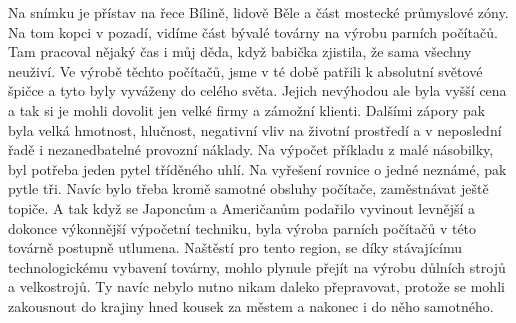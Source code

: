 
Na snímku je přístav na řece Bílině, lidově Běle a část mostecké
průmyslové zóny. Na tom kopci v pozadí, vidíme část bývalé továrny na
výrobu parních počítačů. Tam pracoval nějaký čas i můj děda, když
babička zjistila, že sama všechny neuživí. Ve výrobě těchto počítačů,
jsme v té době patřili k absolutní světové špičce a tyto byly vyváženy
do celého světa. Jejich nevýhodou ale byla vyšší cena a tak si je
mohli dovolit jen velké firmy a zámožní klienti. Dalšími zápory
pak byla velká hmotnost, hlučnost, negativní vliv na životní
prostředí a v neposlední řadě i nezanedbatelné provozní náklady.
Na výpočet příkladu z malé násobilky, byl potřeba jeden pytel
tříděného uhlí. Na vyřešení rovnice o jedné neznámé, pak pytle
tři. Navíc bylo třeba kromě samotné obsluhy počítače, zaměstnávat
ještě topiče. A tak když se Japoncům a Američanům podařilo
vyvinout levnější a dokonce výkonnější výpočetní techniku, byla
výroba parních počítačů v této továrně postupně utlumena. Naštěstí
pro tento region, se díky stávajícímu technologickému vybavení
továrny, mohlo plynule přejít na výrobu důlních strojů a
velkostrojů. Ty navíc nebylo nutno nikam daleko přepravovat,
protože se mohli zakousnout do krajiny hned kousek za městem a
nakonec i do něho samotného.
